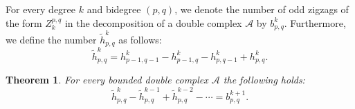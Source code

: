 \documentclass[leqno]{article}
\newtheorem{Theorem}[equation]{Theorem}
\theoremstyle{definition}
\numberwithin{equation}{section}
\begin{document}
For every degree $k$ and bidegree $(p, q)$, we denote the number of odd zigzags of the form $Z^{p, q}_k$ in the decomposition of a double complex $\mathcal{A}$ by $b^k_{p, q}$. Furthermore, we define the number $\tilde{h}^k_{p, q}$ as follows:
\begin{equation}
\label{eq_bigolin}
\tilde{h}^k_{p, q}
=
h^k_{p-1, q-1} - h^k_{p-1, q} - h^k_{p, q-1} + h^k_{p, q}.
\end{equation}
\begin{Theorem}
\label{submain}
For every bounded double complex $\mathcal{A}$ the following holds:
\begin{equation}
\label{eq_main}
\tilde{h}^{k}_{p, q}
-
\tilde{h}^{k-1}_{p, q}
+
\tilde{h}^{k-2}_{p, q}
-
\cdots
=
b^{k+1}_{p, q}.
\end{equation}
\end{Theorem}
\end{document}

